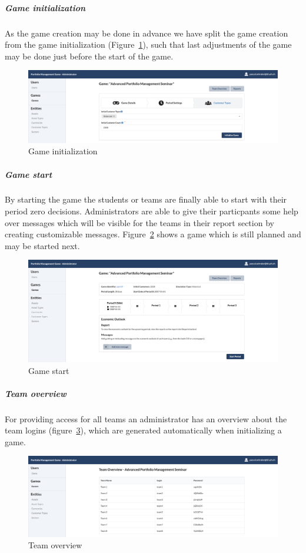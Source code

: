 \subparagraph{Game initialization}
As the game creation may be done in advance we have split the game creation from the game initialization (Figure~\ref{fig:game_initialization}), such that last adjustments of the game may be done just before the start of the game.
\begin{figure}[h!]
  \centering
  \includegraphics[scale=0.2]{img/application-overview/administrator/04_game_initialization.png}
  \caption{Game initialization}
  \label{fig:game_initialization}
\end{figure}

\subparagraph{Game start}
By starting the game the students or teams are finally able to start with their period zero decisions. Administrators are able to give their particpants some help over messages which will be visible for the teams in their report section by creating customizable messages. Figure~\ref{fig:game_start} shows a game which is still planned and may be started next.
\begin{figure}[h!]
  \centering
  \includegraphics[scale=0.2]{img/application-overview/administrator/05_game_start.png}
  \caption{Game start}
  \label{fig:game_start}
\end{figure}


\subparagraph{Team overview}
\label{subparagraph:team_overview}
For providing access for all teams an administrator has an overview about the team logins (figure~\ref{fig:team_overview}), which are generated automatically when initializing a game.
\begin{figure}[h!]
  \centering
  \includegraphics[scale=0.2]{img/application-overview/administrator/06_team_login_overview.png}
  \caption{Team overview}
  \label{fig:team_overview}
\end{figure}

